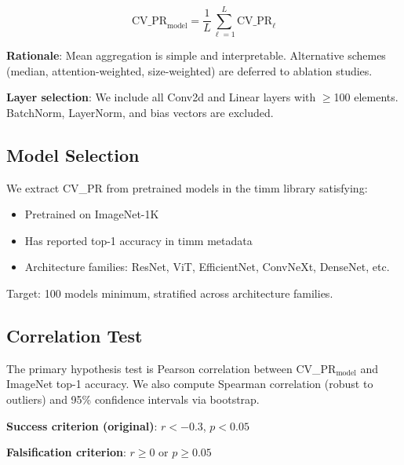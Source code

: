 \begin{equation}
\text{CV\_PR}_\text{model} = \frac{1}{L} \sum_{\ell=1}^{L} \text{CV\_PR}_\ell
\end{equation}

\textbf{Rationale}: Mean aggregation is simple and interpretable. Alternative schemes (median, attention-weighted, size-weighted) are deferred to ablation studies.

\textbf{Layer selection}: We include all Conv2d and Linear layers with $\geq$100 elements. BatchNorm, LayerNorm, and bias vectors are excluded.

\subsection{Model Selection}

We extract CV\_PR from pretrained models in the timm library satisfying:
\begin{itemize}
    \item Pretrained on ImageNet-1K
    \item Has reported top-1 accuracy in timm metadata
    \item Architecture families: ResNet, ViT, EfficientNet, ConvNeXt, DenseNet, etc.
\end{itemize}

Target: 100 models minimum, stratified across architecture families.

\subsection{Correlation Test}

The primary hypothesis test is Pearson correlation between CV\_PR$_\text{model}$ and ImageNet top-1 accuracy. We also compute Spearman correlation (robust to outliers) and 95\% confidence intervals via bootstrap.

\textbf{Success criterion (original)}: $r < -0.3$, $p < 0.05$

\textbf{Falsification criterion}: $r \geq 0$ or $p \geq 0.05$
